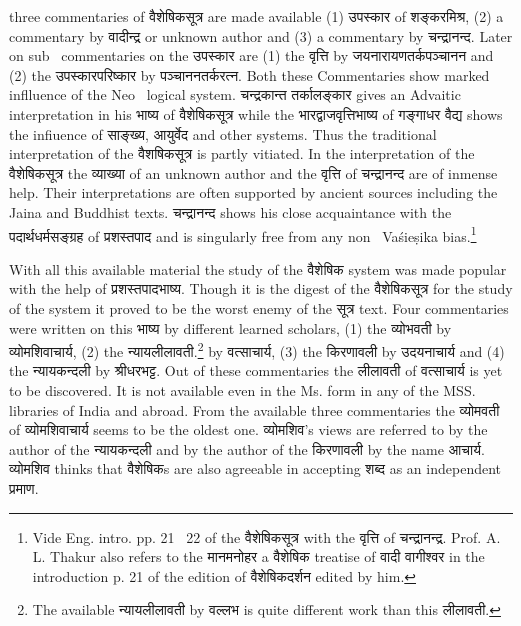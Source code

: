 \documentclass[11pt, openany]{book}
\begin{document}
\newpage
\noindent
three commentaries of वैशेषिकसूत्र are made available (1) उपस्कार of शङ्करमिश्र, (2) a commentary by वादीन्द्र or unknown author and (3) a commentary by चन्द्रानन्द. Later on sub \textendash\ commentaries on the उपस्कार are (1) the वृत्ति by जयनारायणतर्कपञ्चानन and (2) the उपस्कारपरिष्कार by पञ्चाननतर्करत्न. Both these Commentaries show marked inflluence of the Neo \textendash\ logical system. चन्द्रकान्त तर्कालङ्कार gives an Advaitic interpretation in his भाष्य of वैशेषिकसूत्र while the भारद्वाजवृत्तिभाष्य of गङ्गाधर वैद्य shows the infiuence of साङ्ख्य, आयुर्वेद and other systems. Thus the traditional interpretation of the वैशषिकसूत्र is partly vitiated. In the interpretation of the वैशेषिकसूत्र the व्याख्या of an unknown author and the वृत्ति of चन्द्रानन्द are of inmense help. Their interpretations are often supported by ancient sources including the Jaina and Buddhist texts. चन्द्रानन्द shows his close acquaintance with the पदार्थधर्मसङ्ग्रह of प्रशस्तपाद and is singularly free from any non \textendash\ Vaśieṣika bias.\renewcommand{\thefootnote}{1}\footnote{Vide Eng. intro. pp. 21 \textendash\ 22 of the वैशेषिकसूत्र with the वृत्ति of चन्द्रानन्द्र. Prof. A. L. Thakur also refers to the मानमनोहर a वैशेषिक treatise of वादी वागीश्वर in the introduction p. 21 of the edition of वैशेषिकदर्शन edited by him.}

With all this available material the study of the वैशेषिक system was made popular with the help of प्रशस्तपादभाष्य. Though it is the digest of the वैशेषिकसूत्र for the study of the system it proved to be the worst enemy of the सूत्र text. Four commentaries were written on this भाष्य by different learned scholars, (1) the व्योभवती by व्योमशिवाचार्य, (2) the न्यायलीलावती.\renewcommand{\thefootnote}{2}\footnote{The available न्यायलीलावती by वल्लभ is quite different work than this लीलावती.} by वत्साचार्य, (3) the किरणावली by उदयनाचार्य and (4) the न्यायकन्दली by श्रीधरभट्ट. Out of these commentaries the लीलावती of वत्साचार्य is yet to be discovered. It is not available even in the Ms. form in any of the MSS. libraries of India and abroad. From the available three commentaries the व्योमवती of व्योमशिवाचार्य seems to be the oldest one. व्योमशिव's views are referred to by the author of the न्यायकन्दली and by the author of the किरणावली by the name आचार्य. व्योमशिव thinks that वैशेषिकs are also agreeable in accepting शब्द as an independent प्रमाण.
\end{document}
